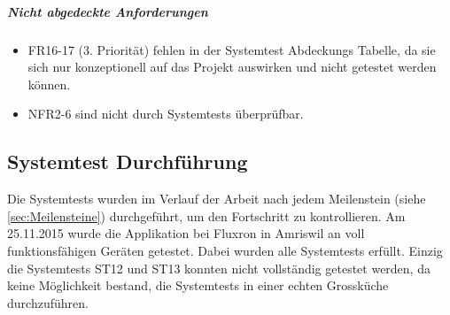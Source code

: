 \subparagraph{Nicht abgedeckte Anforderungen}
\begin{itemize}
\item \ac{FR}16-17 (3. Priorität) fehlen in der Systemtest Abdeckungs Tabelle, da sie sich nur konzeptionell auf das Projekt auswirken und nicht getestet werden können.
\item \ac{NFR}2-6 sind nicht durch Systemtests überprüfbar.
\end{itemize}

\subsection{Systemtest Durchführung}
\label{sub:systemtest_durchfuehrung}

Die Systemtests wurden im Verlauf der Arbeit nach jedem Meilenstein (siehe \ref{sec:Meilensteine}) durchgeführt, um den Fortschritt zu kontrollieren. Am 25.11.2015 wurde die Applikation bei Fluxron in Amriswil an voll funktionsfähigen Geräten getestet. Dabei wurden alle Systemtests erfüllt. Einzig die Systemtests ST12 und ST13 konnten nicht vollständig getestet werden, da keine Möglichkeit bestand, die Systemtests in einer echten Grossküche durchzuführen.

